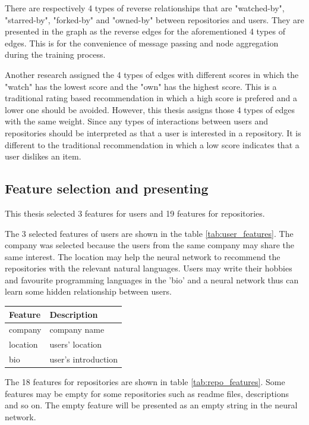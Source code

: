 \documentclass[11pt,twoside]{report}
\begin{document}
There are respectively 4 types of reverse relationships that are "watched-by", "starred-by", "forked-by" and "owned-by" between repositories and users. They are presented in the graph as the reverse edges for the aforementioned 4 types of edges. This is for the convenience of message passing and node aggregation during the training process.

Another research \cite{sun_personalized_2018} assigned the 4 types of edges with different scores in which the "watch" has the lowest score and the "own" has the highest score. This is a traditional rating based recommendation in which a high score is prefered and a lower one should be avoided. However, this thesis assigns those 4 types of edges with the same weight. Since any types of interactions between users and repositories should be interpreted as that a user is interested in a repository. It is different to the traditional recommendation in which a low score indicates that a user dislikes an item.

\subsection{Feature selection and presenting}
This thesis selected 3 features for users and 19 features for repositories. 

The 3 selected features of users are shown in the table \ref{tab:user_features}. The company was selected because the users from the same company may share the same interest. The location may help the neural network to recommend the repositories with the relevant natural languages. Users may write their hobbies and favourite programming languages in the 'bio' and a neural network thus can learn some hidden relationship between users.

\begin{center}
    \begin{tabular}{l | l}
    \hline
    Feature & Description \\
    \hline
    company & company name \\
    location & users' location \\
    bio & user's introduction \\
    \end{tabular}
    \label{tab:user_features}
\end{center}

The 18 features for repositories are shown in table \ref{tab:repo_features}. Some features may be empty for some repositories such as readme files, descriptions and so on. The empty feature will be presented as an empty string in the neural network.
\end{document}
